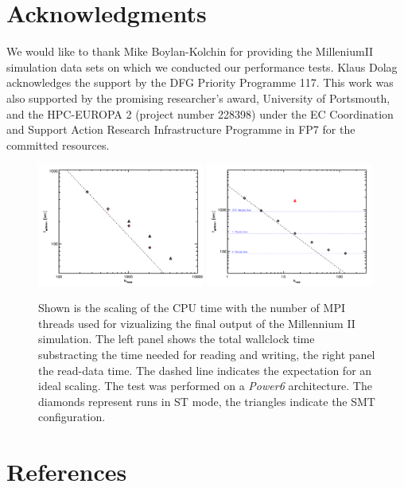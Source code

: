 \documentclass[1p,times]{elsarticle}
\begin{document}
\section*{Acknowledgments}
We would like to thank Mike Boylan-Kolchin for providing the MilleniumII simulation data sets 
on which we conducted our performance tests. 
Klaus Dolag acknowledges the support 
by the DFG Priority Programme 117. This work was also supported by the promising 
researcher's award, University of Portsmouth, and the HPC-EUROPA 2 (project number 228398) 
under the EC Coordination and Support Action Research Infrastructure Programme in FP7 
for the committed resources.

\begin{figure}
\begin{center}
\includegraphics[width=0.49\textwidth]{t_cpu.pdf}
\includegraphics[width=0.49\textwidth]{t_read.pdf}
\end{center}
\caption{Shown is the scaling of the CPU time with the number of MPI threads used 
for vizualizing the
final output of the Millennium II simulation. 
The left panel shows the total wallclock time substracting the time needed for 
reading and writing, the right panel the read-data time. 
The dashed line indicates the expectation for an ideal scaling. The test was 
performed on a {\it Power6} architecture. The diamonds represent runs in ST mode, 
the triangles indicate the SMT configuration.
}\label{cpu_scaling}
\end{figure}

\section*{References}
\end{document}
